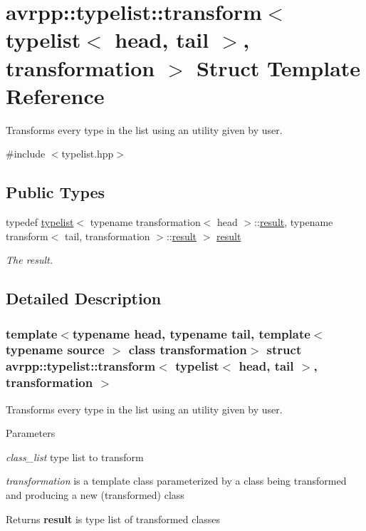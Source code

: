 \hypertarget{structavrpp_1_1typelist_1_1transform_3_01typelist_3_01head_00_01tail_01_4_00_01transformation_01_4}{
\section{avrpp::typelist::transform$<$ typelist$<$ head, tail $>$, transformation $>$ Struct Template Reference}
\label{structavrpp_1_1typelist_1_1transform_3_01typelist_3_01head_00_01tail_01_4_00_01transformation_01_4}
}


Transforms every type in the list using an utility given by user.  




{\ttfamily \#include $<$typelist.hpp$>$}

\subsection*{Public Types}
\begin{DoxyCompactItemize}
\item 
typedef \hyperlink{structavrpp_1_1typelist_1_1typelist}{typelist}$<$ typename transformation$<$ head $>$::\hyperlink{structavrpp_1_1typelist_1_1typelist}{result}, typename transform$<$ tail, transformation $>$::\hyperlink{structavrpp_1_1typelist_1_1typelist}{result} $>$ \hyperlink{structavrpp_1_1typelist_1_1transform_3_01typelist_3_01head_00_01tail_01_4_00_01transformation_01_4_a86e942ad3ce6ca72fd798110269a71f7}{result}
\begin{DoxyCompactList}\small\item\em The result. \item\end{DoxyCompactList}\end{DoxyCompactItemize}


\subsection{Detailed Description}
\subsubsection*{template$<$typename head, typename tail, template$<$ typename source $>$ class transformation$>$ struct avrpp::typelist::transform$<$ typelist$<$ head, tail $>$, transformation $>$}

Transforms every type in the list using an utility given by user. 
\begin{DoxyParams}{Parameters}
\item[{\em class\_\-list}]type list to transform \item[{\em transformation}]is a template class parameterized by a class being transformed and producing a new (transformed) class \end{DoxyParams}
\begin{DoxyReturn}{Returns}
{\bfseries result} is type list of transformed classes 
\end{DoxyReturn}


